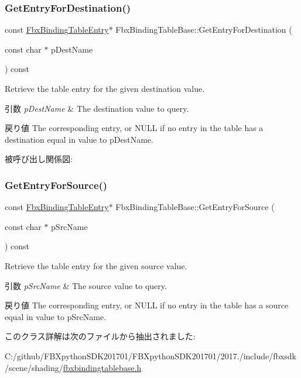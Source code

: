 \subsubsection{\texorpdfstring{Get\+Entry\+For\+Destination()}{GetEntryForDestination()}}
{\footnotesize\ttfamily const \hyperlink{class_fbx_binding_table_entry}{Fbx\+Binding\+Table\+Entry}$\ast$ Fbx\+Binding\+Table\+Base\+::\+Get\+Entry\+For\+Destination (\begin{DoxyParamCaption}\item[{const char $\ast$}]{p\+Dest\+Name }\end{DoxyParamCaption}) const}

Retrieve the table entry for the given destination value. 
\begin{DoxyParams}{引数}
{\em p\+Dest\+Name} & The destination value to query. \\
\hline
\end{DoxyParams}
\begin{DoxyReturn}{戻り値}
The corresponding entry, or N\+U\+LL if no entry in the table has a destination equal in value to p\+Dest\+Name. 
\end{DoxyReturn}
被呼び出し関係図\+:
\mbox{\label{class_fbx_binding_table_base_aa954d91bd7cf21ab56714414ca1e29f8}} 
\subsubsection{\texorpdfstring{Get\+Entry\+For\+Source()}{GetEntryForSource()}}
{\footnotesize\ttfamily const \hyperlink{class_fbx_binding_table_entry}{Fbx\+Binding\+Table\+Entry}$\ast$ Fbx\+Binding\+Table\+Base\+::\+Get\+Entry\+For\+Source (\begin{DoxyParamCaption}\item[{const char $\ast$}]{p\+Src\+Name }\end{DoxyParamCaption}) const}

Retrieve the table entry for the given source value. 
\begin{DoxyParams}{引数}
{\em p\+Src\+Name} & The source value to query. \\
\hline
\end{DoxyParams}
\begin{DoxyReturn}{戻り値}
The corresponding entry, or N\+U\+LL if no entry in the table has a source equal in value to p\+Src\+Name. 
\end{DoxyReturn}


このクラス詳解は次のファイルから抽出されました\+:\begin{DoxyCompactItemize}
\item 
C\+:/github/\+F\+B\+Xpython\+S\+D\+K201701/\+F\+B\+Xpython\+S\+D\+K201701/2017./include/fbxsdk/scene/shading/\hyperlink{fbxbindingtablebase_8h}{fbxbindingtablebase.\+h}\end{DoxyCompactItemize}
